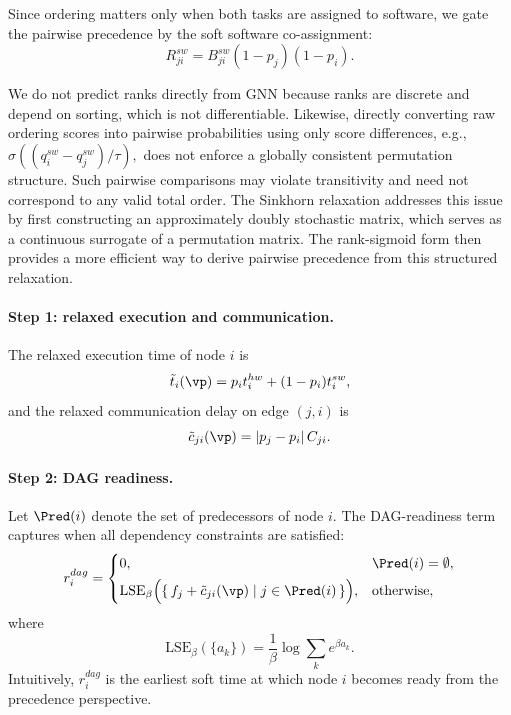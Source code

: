 Since ordering matters only when both tasks are assigned to software, we gate the pairwise precedence by the soft software co-assignment:
\begin{equation}
R^{sw}_{ji}=B^{sw}_{ji}(1-p_j)(1-p_i).
\end{equation}

We do not predict ranks directly from GNN because ranks are discrete and depend on sorting, which is not differentiable. Likewise, directly converting raw ordering scores into pairwise probabilities using only score differences, e.g.,
\(
\sigma((q_i^{sw}-q_j^{sw})/\tau),
\)
does not enforce a globally consistent permutation structure. Such pairwise comparisons may violate transitivity and need not correspond to any valid total order. The Sinkhorn relaxation addresses this issue by first constructing an approximately doubly stochastic matrix, which serves as a continuous surrogate of a permutation matrix. The rank-sigmoid form then provides a more efficient way to derive pairwise precedence from this structured relaxation.

\paragraph{\textbf{Step 1: relaxed execution and communication.}}
The relaxed execution time of node $i$ is
\begin{equation}
\tilde{t}_i(\vp)=p_i t_i^{hw} + (1-p_i)t_i^{sw},
\end{equation}
and the relaxed communication delay on edge $(j,i)$ is
\begin{equation}
\tilde{c}_{ji}(\vp)=|p_j-p_i|\,C_{ji}.
\end{equation}

\paragraph{\textbf{Step 2: DAG readiness.}}
Let $\Pred(i)$ denote the set of predecessors of node $i$. The DAG-readiness term captures when all dependency constraints are satisfied:
\begin{equation}
r_i^{dag}
=
\begin{cases}
0, & \Pred(i)=\emptyset,\\[4pt]
\mathrm{LSE}_{\beta}
\Big(
\{\, f_j + \tilde{c}_{ji}(\vp) \mid j \in \Pred(i)\,\}
\Big), & \text{otherwise},
\end{cases}
\end{equation}
where
\begin{equation}
\mathrm{LSE}_{\beta}(\{a_k\}) = \frac{1}{\beta}\log\sum_k e^{\beta a_k}.
\end{equation}
Intuitively, $r_i^{dag}$ is the earliest soft time at which node $i$ becomes ready from the precedence perspective.

